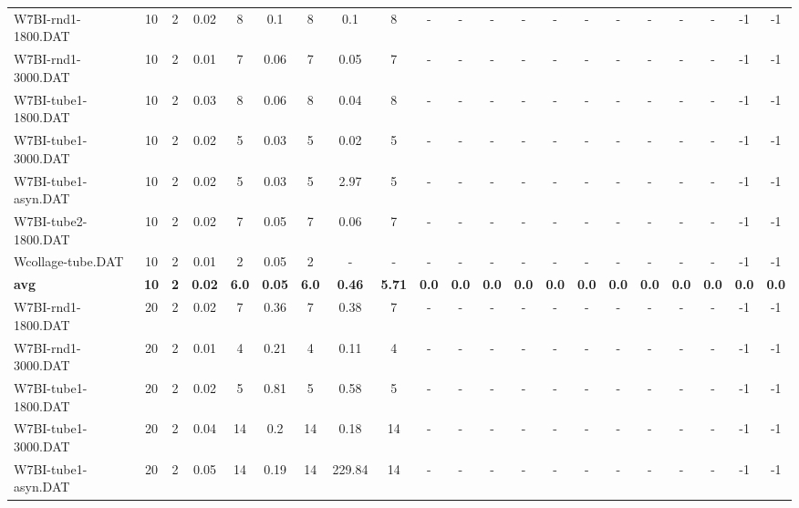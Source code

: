 \begin{sidewaystable}[!ht]
{\begin{tabular}{lcccccccccccccccccccc}
W7BI-rnd1-1800.DAT & 10 & 2 &  \textcolor{blue2}{0.02} & 8 & 0.1 & 8 & 0.1 & 8 &  - &  - &  - &  - &  - &  - &  - &  - &  - &  - & -1 & -1 \\
W7BI-rnd1-3000.DAT & 10 & 2 &  \textcolor{blue2}{0.01} & 7 & 0.06 & 7 & 0.05 & 7 &  - &  - &  - &  - &  - &  - &  - &  - &  - &  - & -1 & -1 \\
W7BI-tube1-1800.DAT & 10 & 2 &  \textcolor{blue2}{0.03} & 8 & 0.06 & 8 & 0.04 & 8 &  - &  - &  - &  - &  - &  - &  - &  - &  - &  - & -1 & -1 \\
W7BI-tube1-3000.DAT & 10 & 2 &  \textcolor{blue2}{0.02} & 5 & 0.03 & 5 &  \textcolor{blue2}{0.02} & 5 &  - &  - &  - &  - &  - &  - &  - &  - &  - &  - & -1 & -1 \\
W7BI-tube1-asyn.DAT & 10 & 2 &  \textcolor{blue2}{0.02} & 5 & 0.03 & 5 & 2.97 & 5 &  - &  - &  - &  - &  - &  - &  - &  - &  - &  - & -1 & -1 \\
W7BI-tube2-1800.DAT & 10 & 2 &  \textcolor{blue2}{0.02} & 7 & 0.05 & 7 & 0.06 & 7 &  - &  - &  - &  - &  - &  - &  - &  - &  - &  - & -1 & -1 \\
Wcollage-tube.DAT & 10 & 2 &  \textcolor{blue2}{0.01} & 2 & 0.05 & 2 &  - &  - &  - &  - &  - &  - &  - &  - &  - &  - &  - &  - & -1 & -1 \\
\cline{1-21} \textbf{avg} & \textbf{10} & \textbf{2} & \textbf{0.02} & \textbf{6.0} & \textbf{0.05} & \textbf{6.0} & \textbf{0.46} & \textbf{5.71} & \textbf{0.0} & \textbf{0.0} & \textbf{0.0} & \textbf{0.0} & \textbf{0.0} & \textbf{0.0} & \textbf{0.0} & \textbf{0.0} & \textbf{0.0} & \textbf{0.0} & \textbf{0.0} & \textbf{0.0} \\ \cline{1-21}
W7BI-rnd1-1800.DAT & 20 & 2 &  \textcolor{blue2}{0.02} & 7 & 0.36 & 7 & 0.38 & 7 &  - &  - &  - &  - &  - &  - &  - &  - &  - &  - & -1 & -1 \\
W7BI-rnd1-3000.DAT & 20 & 2 &  \textcolor{blue2}{0.01} & 4 & 0.21 & 4 & 0.11 & 4 &  - &  - &  - &  - &  - &  - &  - &  - &  - &  - & -1 & -1 \\
W7BI-tube1-1800.DAT & 20 & 2 &  \textcolor{blue2}{0.02} & 5 & 0.81 & 5 & 0.58 & 5 &  - &  - &  - &  - &  - &  - &  - &  - &  - &  - & -1 & -1 \\
W7BI-tube1-3000.DAT & 20 & 2 &  \textcolor{blue2}{0.04} & 14 & 0.2 & 14 & 0.18 & 14 &  - &  - &  - &  - &  - &  - &  - &  - &  - &  - & -1 & -1 \\
W7BI-tube1-asyn.DAT & 20 & 2 &  \textcolor{blue2}{0.05} & 14 & 0.19 & 14 & 229.84 & 14 &  - &  - &  - &  - &  - &  - &  - &  - &  - &  - & -1 & -1 \\

\end{tabular}}
\end{sidewaystable}

